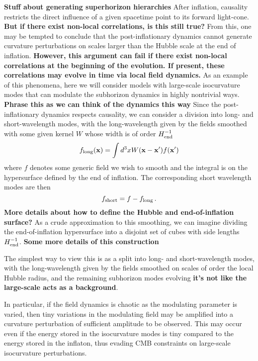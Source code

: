 {\bf Stuff about generating superhorizon hierarchies}
After inflation, causality restricts the direct influence of a given spacetime point to its forward light-cone. {\bf But if there exist non-local correlations, is this still true?}
From this, one may be tempted to conclude that the post-inflationary dynamics cannot generate curvature perturbations on scales larger than the Hubble scale at the end of inflation.
{\bf However, this argument can fail if there exist non-local correlations at the beginning of the evolution.  If present, these correlations may evolve in time via local field dynamics.}
As an example of this phenomena, here we will consider models with large-scale isocurvature modes that can modulate the subhorizon dynamics in highly nontrivial ways.
{\bf Phrase this as we can think of the dynamics this way}
Since the post-inflationary dynamics respects causality, we can consider a division into long- and short-wavelength modes,
with the long-wavelength given by the fields smoothed with some given kernel $W$ whose width is of order $H_{\rm end}^{-1}$
\begin{equation}
  f_{\rm long}({\bf x}) = \int d^3x W({\bf x}-{\bf x'}) f({\bf x'})
\end{equation}
where $f$ denotes some generic field we wish to smooth and the integral is on the hypersurface defined by the end of inflation.
The corresponding short wavelength modes are then
\begin{equation}
  f_{\rm short} = f - f_{\rm long} \, .
\end{equation}
{\bf More details about how to define the Hubble and end-of-inflation surface?}
As a crude approximation to this smoothing, we can imagine dividing the end-of-inflation hypersurface into a disjoint set of cubes with side lengths $H_{\rm end}^{-1}$.
{\bf Some more details of this construction}

The simplest way to view this is as a split into long- and short-wavelength modes, with the long-wavelength given by the fields smoothed on scales of order the local Hubble radius, and the remaining subhorizon modes evolving {\bf it's not like the large-scale acts as a background}.

In particular, if the field dynamics is chaotic as the modulating parameter is varied, then tiny variations in the modulating field may be amplified into a curvature perturbation of sufficient amplitude to be observed.
This may occur even if the energy stored in the isocurvature modes is tiny compared to the energy stored in the inflaton, thus evading CMB constraints on large-scale isocurvature perturbations.

